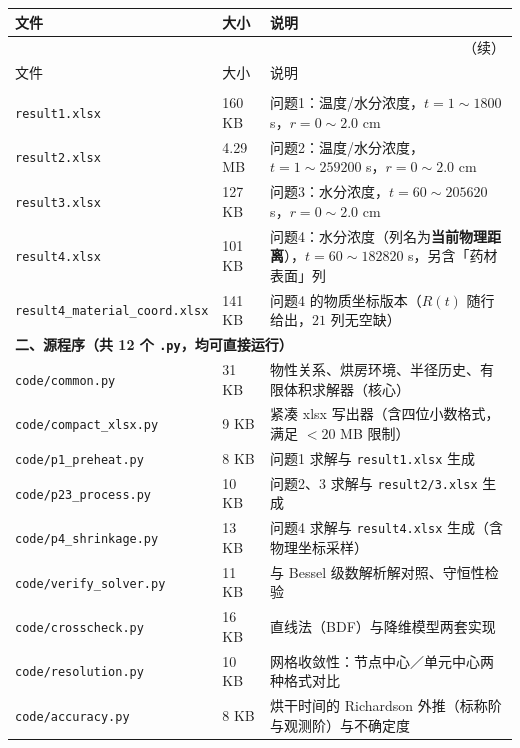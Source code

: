 {\small
\begin{longtable}{p{}p{}p{}}
\toprule[1.2pt]
文件 & 大小 & 说明 \\
\midrule
\endfirsthead
\multicolumn{3}{r}{\small（续）}\\
\toprule[1.2pt]
文件 & 大小 & 说明 \\
\midrule
\endhead
\bottomrule[1.2pt]
\endfoot
\multicolumn{3}{l}{\textbf{一、结果文件（题目要求的交付物）}} \\
\texttt{result1.xlsx} & 160 KB & 问题1：温度/水分浓度，$t=1\!\sim\!1800$ s，$r=0\!\sim\!2.0$ cm \\
\texttt{result2.xlsx} & 4.29 MB & 问题2：温度/水分浓度，$t=1\!\sim\!259200$ s，$r=0\!\sim\!2.0$ cm \\
\texttt{result3.xlsx} & 127 KB & 问题3：水分浓度，$t=60\!\sim\!205620$ s，$r=0\!\sim\!2.0$ cm \\
\texttt{result4.xlsx} & 101 KB & 问题4：水分浓度（列名为\textbf{当前物理距离}），$t=60\!\sim\!182820$ s，另含「药材表面」列 \\
\texttt{result4\_material\_coord.xlsx} & 141 KB & 问题4 的物质坐标版本（$R(t)$ 随行给出，$21$ 列无空缺） \\
\midrule
\multicolumn{3}{l}{\textbf{二、源程序（共 12 个 \texttt{.py}，均可直接运行）}} \\
\texttt{code/common.py} & 31 KB & 物性关系、烘房环境、半径历史、有限体积求解器（核心） \\
\texttt{code/compact\_xlsx.py} & 9 KB & 紧凑 xlsx 写出器（含四位小数格式，满足 $<20$ MB 限制） \\
\texttt{code/p1\_preheat.py} & 8 KB & 问题1 求解与 \texttt{result1.xlsx} 生成 \\
\texttt{code/p23\_process.py} & 10 KB & 问题2、3 求解与 \texttt{result2/3.xlsx} 生成 \\
\texttt{code/p4\_shrinkage.py} & 13 KB & 问题4 求解与 \texttt{result4.xlsx} 生成（含物理坐标采样） \\
\texttt{code/verify\_solver.py} & 11 KB & 与 Bessel 级数解析解对照、守恒性检验 \\
\texttt{code/crosscheck.py} & 16 KB & 直线法（BDF）与降维模型两套实现 \\
\texttt{code/resolution.py} & 10 KB & 网格收敛性：节点中心／单元中心两种格式对比 \\
\texttt{code/accuracy.py} & 8 KB & 烘干时间的 Richardson 外推（标称阶与观测阶）与不确定度 \\

\end{longtable}}
